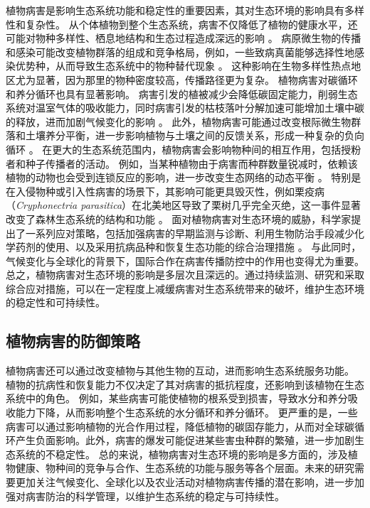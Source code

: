 \documentclass[AutoFakeBold]{LZUThesis-PgD&PhD}
\begin{document}
	植物病害是影响生态系统功能和稳定性的重要因素，其对生态环境的影响具有多样性和复杂性。
	从个体植物到整个生态系统，病害不仅降低了植物的健康水平，还可能对物种多样性、栖息地结构和生态过程造成深远的影响 \cite{Mitchell2002}。
	病原微生物的传播和感染可能改变植物群落的组成和竞争格局，例如，一些致病真菌能够选择性地感染优势种，从而导致生态系统中的物种替代现象 \cite{Garrett2006}。
	这种影响在生物多样性热点地区尤为显著，因为那里的物种密度较高，传播路径更为复杂。
	植物病害对碳循环和养分循环也具有显著影响。
	病害引发的植被减少会降低碳固定能力，削弱生态系统对温室气体的吸收能力，同时病害引发的枯枝落叶分解加速可能增加土壤中碳的释放，进而加剧气候变化的影响 \cite{Allison2008}。
	此外，植物病害可能通过改变根际微生物群落和土壤养分平衡，进一步影响植物与土壤之间的反馈关系，形成一种复杂的负向循环 \cite{Bever2010}。
	在更大的生态系统范围内，植物病害会影响物种间的相互作用，包括授粉者和种子传播者的活动。
	例如，当某种植物由于病害而种群数量锐减时，依赖该植物的动物也会受到连锁反应的影响，进一步改变生态网络的动态平衡 \cite{Maron2011}。
	特别是在入侵物种或引入性病害的场景下，其影响可能更具毁灭性，例如栗疫病（\textit{Cryphonectria parasitica}）在北美地区导致了栗树几乎完全灭绝，这一事件显著改变了森林生态系统的结构和功能 \cite{Anagnostakis1987}。
	面对植物病害对生态环境的威胁，科学家提出了一系列应对策略，包括加强病害的早期监测与诊断、利用生物防治手段减少化学药剂的使用、以及采用抗病品种和恢复生态功能的综合治理措施 \cite{Pautasso2010}。
	与此同时，气候变化与全球化的背景下，国际合作在病害传播防控中的作用也变得尤为重要。
	总之，植物病害对生态环境的影响是多层次且深远的。通过持续监测、研究和采取综合应对措施，可以在一定程度上减缓病害对生态系统带来的破坏，维护生态环境的稳定性和可持续性。
	
	
	
	\subsection{植物病害的防御策略}
	
	植物病害还可以通过改变植物与其他生物的互动，进而影响生态系统服务功能。
	植物的抗病性和恢复能力不仅决定了其对病害的抵抗程度，还影响到该植物在生态系统中的角色。
	例如，某些病害可能使植物的根系受到损害，导致水分和养分吸收能力下降，从而影响整个生态系统的水分循环和养分循环\cite{Schultz2010}。
	更严重的是，一些病害可以通过影响植物的光合作用过程，降低植物的碳固存能力，从而对全球碳循环产生负面影响\cite{Barton2011}。此外，病害的爆发可能促进某些害虫种群的繁殖，进一步加剧生态系统的不稳定性。
	总的来说，植物病害对生态环境的影响是多方面的，涉及植物健康、物种间的竞争与合作、生态系统的功能与服务等各个层面。未来的研究需要更加关注气候变化、全球化以及农业活动对植物病害传播的潜在影响，进一步加强对病害防治的科学管理，以维护生态系统的稳定与可持续性。
	
\end{document}
